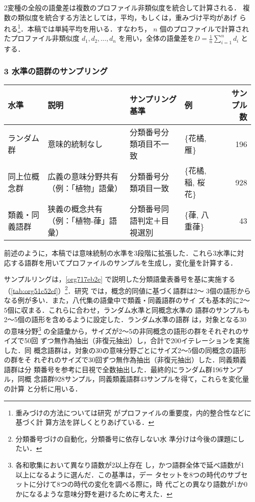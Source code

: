\documentclass[submit]{ipsj}
\renewcommand{\ref}{\cref}
\begin{document}
2変種の全般の語彙差は複数のプロファイル非類似度を統合して計算される．
複数の類似度を統合する方法としては，平均，もしくは，重みづけ平均があげ
られる\footnote{重みづけの方法については研究 \cite{Ruette2014Semantic} がプロファイルの重要度，内的整合性などに基づく計
算方法を詳しくとりあげている．}．本稿では単純平均を用いる．すなわち，
\(n\) 個のプロファイルで計算されたプロファイル非類似度 \(d_1, d_2,
\ldots, d_n\) を用い，全体の語彙差を\(D=\frac{1}{n} \sum_{i=1}^{n}
d_i\) とする．
\subsubsection{3 水準の語群のサンプリング\label{orgc4bd086}}
\label{sec:org4c7cde7}
\begin{table*}[t]
\caption{\label{tab:org51c52ef}3水準の語形集合のサンプル例}
\centering
\begin{tabular}{llllr}
水準 & 説明 & サンプリング基準 & 例 & サンプル数\\
\hline
ランダム群 & 意味的統制なし & 分類番号分類項目不一致 & \{花橘, 雁\} & 196\\
同上位概念群 & 広義の意味分野共有（例：「植物」語彙） & 分類番号分類項目一致 & \{花橘, 稲, 桜花\} & 928\\
類義・同義語群 & 狭義の概念共有（例：「植物-葎」語彙） & 分類番号同語判定＋目視選別 & \{葎, 八重葎\} & 43\\
\end{tabular}
\end{table*}

前述のように，本稿では意味統制の水準を3段階に拡張した．これら3水準に対
応する語群を用いてプロファイルのサンプルを生成し，変化量を計算する．

サンプルリングは，\ref{org717eb2e} で説明した分類語彙表番号を基に実施する
（\ref{tab:org51c52ef}）\footnote{分類番号づけの自動化，分類番号に依存しない水
準分けは今後の課題にしたい．}．研究
\cite{Speelman2003Profilebased} では，概念的同値に基づく語群は2～
3個の語形からなる例が多い．また，八代集の語彙中で類義・同義語群のサイ
ズも基本的に2～5個に収まる．これらに合わせ，ランダム水準と同概念水準の
語群のサンプルも2～5個の語形を含めるように設定した．ランダム水準の語群
は，対象となる30の意味分野\footnote{各和歌集において異なり語数が2以上存在
し，かつ語群全体で延べ語数が1以上になるように選んだ．この基準は，デー
タセットを8つの時代のサブセットに分けて8つの時代の変化を調べる際に，時
代ごとの異なり語数が1か0かになるような意味分野を避けるために考えた．}
の全語彙から，サイズが2～5の非同概念の語形の群をそれぞれのサイズで50回
ずつ無作為抽出（非復元抽出）し，合計で200イテレーションを実施した．同
概念語群は，対象の30の意味分野ごとにサイズ2～5個の同概念の語形の群をそ
れぞれのサイズで30回ずつ無作為抽出（非復元抽出）した．同義類義語群は分
類番号を参考に目視で全数抽出した．最終的にランダム群196サンプル，同概
念語群928サンプル，同義類義語群43サンプルを得て，これらを変化量の計算
と分析に用いる．
\end{document}
